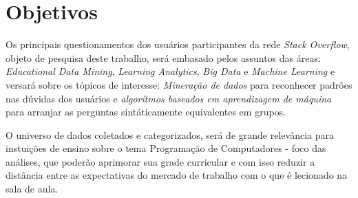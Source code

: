 \documentclass[
	12pt,				%
	openright,		%
	twoside,			%
	a4paper,			%
	english,				%
	french,				%
	spanish,			%
	brazil,				%
	]{abntex2}
\begin{document}
\chapter{Objetivos}


 Os principais questionamentos dos usuários participantes da rede \textit{Stack Overflow}, objeto de pesquisa deste trabalho, será embasado pelos assuntos das áreas: \textsf{\textit{Educational Data Mining}}, \textsf{\textit{Learning Analytics}}, \textsf{\textit{Big Data}} e \textsf{\textit{Machine Learning}} e versará sobre os tópicos de interesse: \emph{Mineração de dados} para reconhecer padrões nas dúvidas dos usuários e \emph{algorítmos baseados em aprendizagem de máquina} para arranjar as perguntas sintáticamente equivalentes em grupos. 

O universo de dados coletados e categorizados, será de grande relevância  para instuições de ensino sobre o tema Programação de Computadores - foco das análises, que poderão aprimorar sua grade curricular e com isso reduzir a distância entre as expectativas do mercado de trabalho com o que é lecionado na sala de aula.








\postextual
\end{document}
